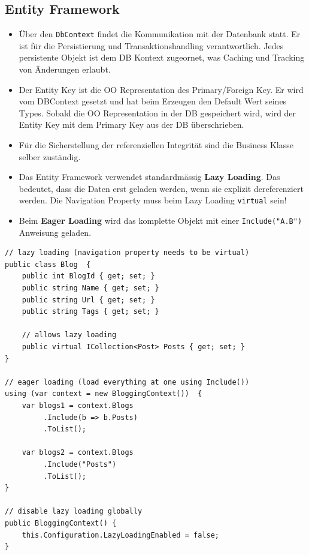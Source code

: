 \subsection{Entity Framework}
\begin{itemize}
	\item Über den \lstinline|DbContext| findet die Kommunikation mit der Datenbank statt. Er ist für die Persistierung und Transaktionshandling verantwortlich. Jedes persistente Objekt ist dem DB Kontext zugeornet, was Caching und Tracking von Änderungen erlaubt.
	\item Der Entity Key ist die OO Representation des Primary/Foreign Key. Er wird vom DBContext gesetzt und hat beim Erzeugen den Default Wert seines Types. Sobald die OO Representation in der DB gespeichert wird, wird der Entity Key mit dem Primary Key aus der DB überschrieben.
	\item Für die Sicherstellung der referenziellen Integrität sind die Business Klasse selber zuständig.
	\item Das Entity Framework verwendet standardmässig \textbf{Lazy Loading}. Das bedeutet, dass die Daten erst geladen werden, wenn sie explizit dereferenziert werden. Die Navigation Property muss beim Lazy Loading \lstinline|virtual| sein!
	\item Beim \textbf{Eager Loading} wird das komplette Objekt mit einer \lstinline|Include("A.B")| Anweisung geladen.
\end{itemize}

\begin{lstlisting}
// lazy loading (navigation property needs to be virtual)
public class Blog  {  
	public int BlogId { get; set; }  
	public string Name { get; set; }  
	public string Url { get; set; }  
	public string Tags { get; set; }  
	
	// allows lazy loading
	public virtual ICollection<Post> Posts { get; set; }  
}

// eager loading (load everything at one using Include())
using (var context = new BloggingContext())  {
	var blogs1 = context.Blogs 
		 .Include(b => b.Posts) 
		 .ToList(); 
	
	var blogs2 = context.Blogs 
		 .Include("Posts") 
		 .ToList();
}

// disable lazy loading globally
public BloggingContext() { 
	this.Configuration.LazyLoadingEnabled = false; 
} 
\end{lstlisting}

\clearpage

